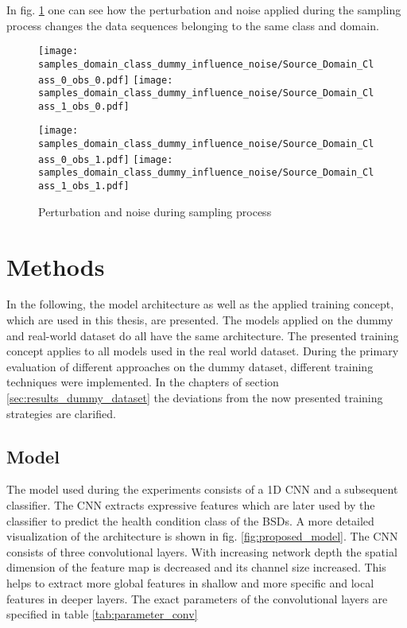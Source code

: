 In fig. \ref{fig:samples_domain_class_dummy_influence_noise} one can see how the perturbation and noise applied during the sampling process changes the data sequences belonging to the same class and domain. 

\begin{figure}[H]
  \centering
  \texttt{[image: samples\_domain\_class\_dummy\_influence\_noise/Source\_Domain\_Class\_0\_obs\_0.pdf]}
  \hspace{.3cm}
  \texttt{[image: samples\_domain\_class\_dummy\_influence\_noise/Source\_Domain\_Class\_1\_obs\_0.pdf]}

  \vspace{.3cm}

  \texttt{[image: samples\_domain\_class\_dummy\_influence\_noise/Source\_Domain\_Class\_0\_obs\_1.pdf]}
  \hspace{.3cm}
  \texttt{[image: samples\_domain\_class\_dummy\_influence\_noise/Source\_Domain\_Class\_1\_obs\_1.pdf]}

  \caption{Perturbation and noise during sampling process}
  \label{fig:samples_domain_class_dummy_influence_noise}
\end{figure}

\section{Methods}\label{chapter:introduction}
In the following, the model architecture as well as the applied training concept, which are used in this thesis, are presented. The models applied on the dummy and real-world dataset do all have the same architecture. The presented training concept applies to all models used in the real world dataset. During the primary evaluation of different approaches on the dummy dataset, different training techniques were implemented. In the chapters of section \ref{sec:results_dummy_dataset} the deviations from the now presented training strategies are clarified.

\subsection{Model}
\label{sec:model}
The model used during the experiments consists of a 1D CNN and a subsequent classifier. The CNN extracts expressive features which are later used by the classifier to predict the health condition class of the BSDs. A more detailed visualization of the architecture is shown in fig. \ref{fig:proposed_model}. The CNN consists of three convolutional layers. With increasing network depth the spatial dimension of the feature map is decreased and its channel size increased. This helps to extract more global features in shallow and more specific and local features in deeper layers. The exact parameters of the convolutional layers are specified in table \ref{tab:parameter_conv} 

